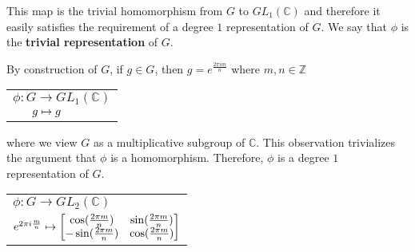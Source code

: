 	

\noindent This map is the trivial homomorphism from $G$ to $GL_1(\mathbb{C})$ and therefore it easily satisfies the requirement of a degree $1$ representation of $G$. We say that $\phi$ is the \textbf{trivial representation} of $G$.

	

\begin{example}\end{example} 
By construction of $G$, if $g\in G$, then $g = e^{\frac{2\pi im }{n}}$ where $m,n\in \mathbb{Z}$	
	\renewcommand{\arraystretch}{0.7}
		\begin{center}	
		 \begin{tabular}{l}$\phi:G\rightarrow GL_1(\mathbb{C})$\\
		$\hspace{6mm}g\mapsto g$
		\end{tabular}
		\end{center}

\noindent where we view $G$ as a multiplicative subgroup of $\mathbb{C}$. This observation trivializes the argument that $\phi$ is a homomorphism. Therefore, $\phi$ is a degree $1$ representation of $G$.		


\begin{example}\end{example}
	\renewcommand{\arraystretch}{1}\begin{center}
		\begin{tabular}{l}$\phi:G\rightarrow GL_2(\mathbb{C})$\\
		$\hspace{0mm}e^{2\pi i\frac{m}{n}}\mapsto \begin{bmatrix}
							\cos(\frac{2\pi m}{n}) & \sin(\frac{2\pi m}{n}) \\
							-\sin(\frac{2\pi m}{n}) & \cos(\frac{2\pi m}{n})
						      \end{bmatrix}$
		\end{tabular}
\end{center}

